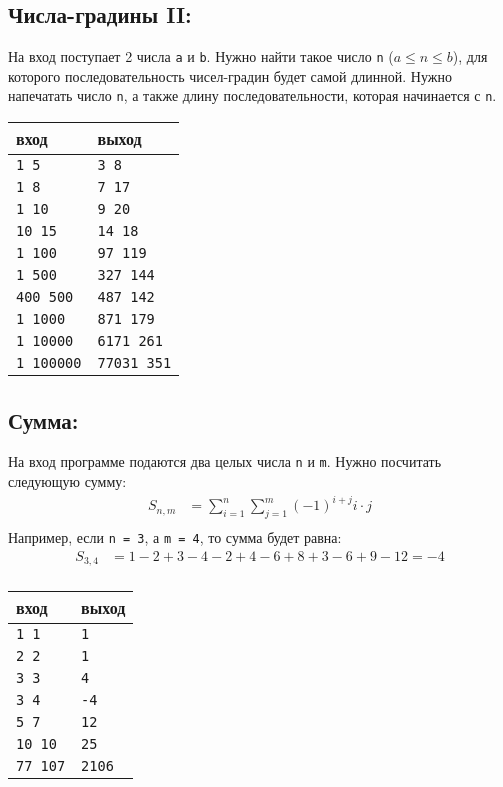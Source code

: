 \documentclass{article}
\begin{document}
\subsection{Числа-градины II:}
На вход поступает 2 числа \texttt{a} и \texttt{b}. Нужно найти такое число \texttt{n} ($a \le n \le b$), для которого последовательность чисел-градин будет самой длинной. Нужно напечатать число \texttt{n}, а также длину последовательности, которая начинается с \texttt{n}.
\begin{center}
\begin{tabular}{ l l }
 вход & выход \\ \hline
 \texttt{1 5}  & \texttt{3 8}  \\ 
 \texttt{1 8} & \texttt{7 17}  \\ 
 \texttt{1 10} & \texttt{9 20}  \\ 
 \texttt{10 15} & \texttt{14 18}  \\ 
 \texttt{1 100} & \texttt{97 119}  \\ 
 \texttt{1 500} & \texttt{327 144}  \\ 
 \texttt{400 500} & \texttt{487 142}  \\ 
 \texttt{1 1000} & \texttt{871 179}  \\ 
 \texttt{1 10000} & \texttt{6171 261}  \\ 
 \texttt{1 100000} & \texttt{77031 351}  \\ 
\end{tabular}
\end{center}

\subsection{Сумма:}
На вход программе подаются два целых числа \texttt{n} и \texttt{m}. Нужно посчитать следующую сумму:
\begin{align*}
  S_{n,m} &= \sum_{i=1}^{n} \sum_{j=1}^{m} (-1)^{i + j} i \cdot j \\
\end{align*}
Например, если \texttt{n = 3}, а \texttt{m = 4}, то сумма будет равна:
\begin{align*}
  S_{3,4} &= 1 - 2 + 3 - 4 - 2 + 4 - 6 + 8 + 3 - 6 + 9 - 12 = -4\\
\end{align*}

\begin{center}
\begin{tabular}{ l l }
 вход & выход \\ \hline
 \texttt{1 1}  & \texttt{1}  \\ 
 \texttt{2 2} & \texttt{1}  \\ 
 \texttt{3 3} & \texttt{4}  \\ 
 \texttt{3 4} & \texttt{-4}  \\  
 \texttt{5 7} & \texttt{12}  \\  
 \texttt{10 10} & \texttt{25}  \\  
 \texttt{77 107} & \texttt{2106}  \\ 
\end{tabular}
\end{center}
\end{document}
